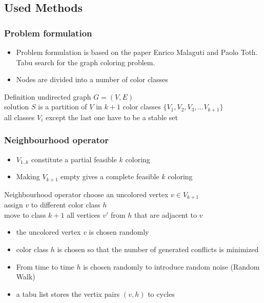 \documentclass{beamer}
\begin{document}
\subsection{Used Methods}
\begin{frame}
    \frametitle{Problem formulation}
\begin{itemize}
  \item Problem formulation is based on the paper Enrico Malaguti and Paolo Toth. Tabu search for the graph coloring problem.
    \item Nodes are divided into a number of color classes
    \end{itemize}
         \begin{block}{Definition}
           undirected graph $G = (V,E)$ \\
           solution $S$ is a partition of $V$ in $k+1$ color classes 
           $\lbrace V_1, V_2, V_3, ... V_{k+1} \rbrace$ \\
           all classes $V_i$ except the last one have to be a stable set
       \end{block}
    
  \end{frame}

\begin{frame}
    \frametitle{Neighbourhood operator}

    \begin{itemize}
    \item $V_{1..k}$ constitute a partial feasible $k$ coloring
    \item Making $V_{k+1}$ empty gives a complete feasible $k$ coloring
    \end{itemize}

       \begin{block}{Neighbourhood operator}
           choose an uncolored vertex $v \in V_{k+1}$ \\
           assign $v$ to different color class $h$\\
           move to class $k+1$ all vertices $v'$ from $h$ that are adjacent to $v$
       \end{block}

       \begin{itemize}
     \item the uncolored vertex $v$ is chosen randomly
     \item color class $h$ is chosen so that the number of generated conflicts is minimized
     \item From time to time $h$ is chosen randomly to introduce random noise (Random Walk)
     \item a tabu list stores the vertix pairs $(v,h)$ to cycles


       \end{itemize}

\end{frame}
\end{document}
